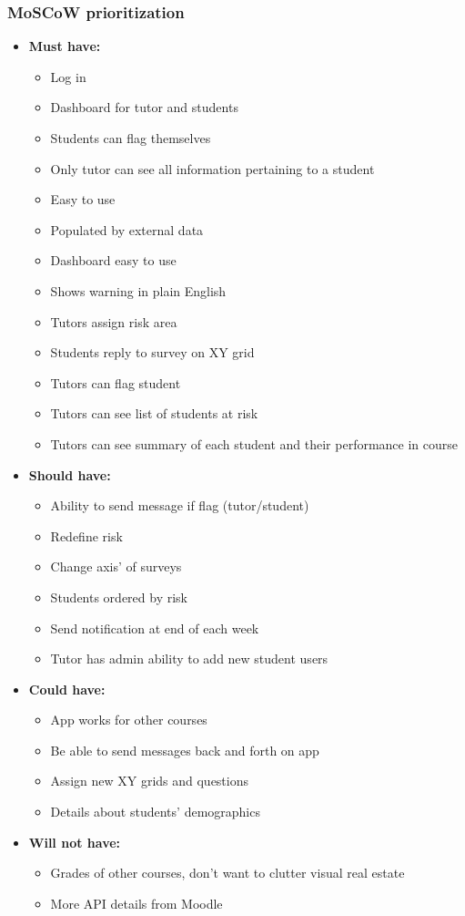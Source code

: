 \documentclass{l4proj}
\begin{document}
\subsubsection{MoSCoW prioritization}
\begin{itemize}
\item\textbf{Must have:}
    \begin{itemize}
        \item 	Log in
        \item 	Dashboard for tutor and students
        \item 	Students can flag themselves
        \item 	Only tutor can see all information pertaining to a student
        \item 	Easy to use
        \item 	Populated by external data
        \item 	Dashboard easy to use
        \item 	Shows warning in plain English
        \item 	Tutors assign risk area
        \item 	Students reply to survey on XY grid
        \item 	Tutors can flag student
        \item 	Tutors can see list of students at risk
        \item 	Tutors can see summary of each student and their performance in course
    \end{itemize}
    \item \textbf{Should have:}
    \begin{itemize}
        \item 	Ability to send message if flag (tutor/student)
        \item 	Redefine risk
        \item Change axis' of surveys
        \item 	Students ordered by risk
        \item 	Send notification at end of each week
        \item 	Tutor has admin ability to add new student users
    \end{itemize}
    \item \textbf{Could have:}
    \begin{itemize}
        \item 	App works for other courses
        \item 	Be able to send messages back and forth on app
        \item 	Assign new XY grids and questions
        \item 	Details about students’ demographics
    \end{itemize}
    \item \textbf{Will not have:}
    \begin{itemize}
        \item 	Grades of other courses, don’t want to clutter visual real estate
        \item 	More API details from Moodle
    \end{itemize}
\end{itemize}
\end{document}
